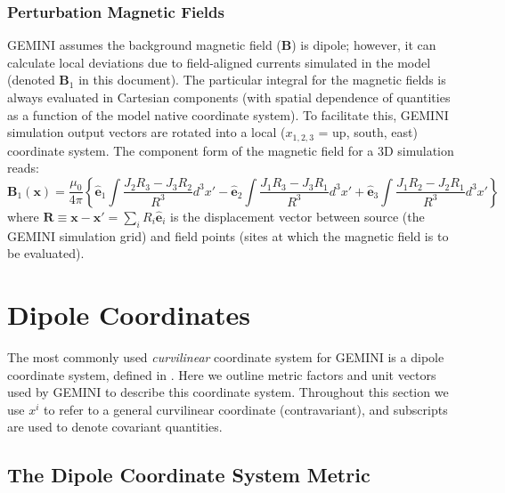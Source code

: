 \documentclass[11pt,letterpaper]{article}
\begin{document}
\subsubsection{Perturbation Magnetic Fields}

GEMINI assumes the background magnetic field ($\mathbf{B}$) is dipole; however, it can calculate local deviations due to field-aligned currents simulated in the model (denoted $\mathbf{B}_1$ in this document).  The particular integral for the magnetic fields is always evaluated in Cartesian components (with spatial dependence of quantities as a function of the model native coordinate system).  To facilitate this, GEMINI simulation output vectors are rotated into a local ($x_{1,2,3}$ = up, south, east) coordinate system.  The component form of the magnetic field for a 3D simulation reads:
\begin{equation}
\mathbf{B}_1(\mathbf{x}) = \frac{\mu_0}{4 \pi} \left\{  \hat{\mathbf{e}}_1 \int \frac{J_2 R_3 - J_3 R_2}{R^3} d^3 x' - \hat{\mathbf{e}}_2 \int \frac{J_1 R_3 - J_3 R_1}{R^3} d^3 x' + \hat{\mathbf{e}}_3 \int \frac{J_1 R_2 - J_2 R_1}{R^3} d^3 x' \right\} \label{eqn:magint3D}
\end{equation}
where $\mathbf{R} \equiv \mathbf{x}-\mathbf{x'} = \sum_i R_i \hat{\mathbf{e}}_i$ is the displacement vector between source (the GEMINI simulation grid) and field points (sites at which the magnetic field is to be evaluated).  


\section{Dipole Coordinates}

The most commonly used \emph{curvilinear} coordinate system for GEMINI is a dipole coordinate system, defined in \citep{Huba:2000}.  Here we outline metric factors and unit vectors used by GEMINI to describe this coordinate system.  Throughout this section we use $x^i$ to refer to a general curvilinear coordinate (contravariant), and subscripts are used to denote covariant quantities.  %


\subsection{The Dipole Coordinate System Metric}
\end{document}
